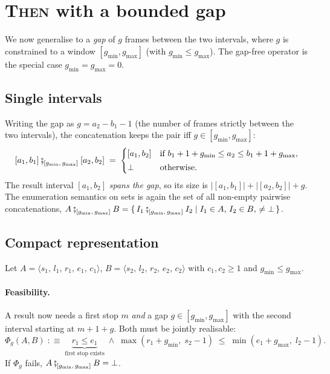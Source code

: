 \documentclass[11pt]{article}
\newcommand{\ThenG}[2]{\mathbin{\fatsemi}_{[#1,\,#2]}} %
\newcommand{\Empty}{\bot}                           %
\newcommand{\size}[1]{\lvert #1 \rvert}
\newcommand{\R}[5]{\langle #1,\, #2,\, #3,\, #4,\, #5 \rangle} %
\newcommand{\gmin}{g_{\min}}
\newcommand{\gmax}{g_{\max}}
\theoremstyle{definition}
\theoremstyle{plain}
\begin{document}
\section{\textsc{Then} with a bounded gap}
\label{sec:gap}

We now generalise to a \emph{gap} of $g$ frames between the two intervals,
where $g$ is constrained to a window $[\gmin, \gmax]$ (with $\gmin \le \gmax$).
The gap-free operator is the special case $\gmin = \gmax = 0$.

\subsection{Single intervals}

Writing the gap as $g = a_2 - b_1 - 1$ (the number of frames strictly between
the two intervals), the concatenation keeps the pair iff $g \in [\gmin, \gmax]$:
\[
  [a_1, b_1] \ThenG{\gmin}{\gmax} [a_2, b_2] \;=\;
  \begin{cases}
    [a_1, b_2] & \text{if } b_1 + 1 + \gmin \le a_2 \le b_1 + 1 + \gmax,\\[2pt]
    \Empty     & \text{otherwise.}
  \end{cases}
\]
The result interval $[a_1, b_2]$ \emph{spans the gap}, so its size is
$\size{[a_1,b_1]} + \size{[a_2,b_2]} + g$. The enumeration semantics on sets is
again the set of all non-empty pairwise concatenations,
$A \ThenG{\gmin}{\gmax} B = \{\, I_1 \ThenG{\gmin}{\gmax} I_2 \mid I_1 \in A,\,
I_2 \in B,\, \neq \Empty \,\}$.

\subsection{Compact representation}

Let $A = \R{s_1}{l_1}{r_1}{e_1}{c_1}$, $B = \R{s_2}{l_2}{r_2}{e_2}{c_2}$ with
$c_1, c_2 \ge 1$ and $\gmin \le \gmax$.

\paragraph{Feasibility.}
A result now needs a first stop $m$ \emph{and} a gap $g \in [\gmin, \gmax]$ with
the second interval starting at $m + 1 + g$. Both must be jointly realisable:
\[
  \Phi_g(A, B)\;:\equiv\;
  \underbrace{r_1 \le e_1}_{\text{first stop exists}}
  \;\wedge\;
  \max(r_1 + \gmin,\; s_2 - 1) \;\le\; \min(e_1 + \gmax,\; l_2 - 1).
\]
If $\Phi_g$ fails, $A \ThenG{\gmin}{\gmax} B = \Empty$.
\end{document}
